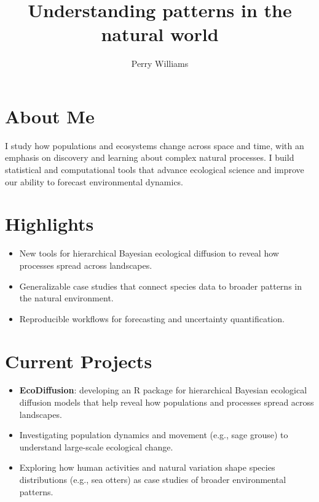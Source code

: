 \title{Understanding patterns in the natural world}
\author{Perry Williams}
\date{}

\maketitle

\section*{About Me}
I study how populations and ecosystems change across space and time, with an emphasis on discovery and learning about complex natural processes. I build statistical and computational tools that advance ecological science and improve our ability to forecast environmental dynamics.

\section*{Highlights}
\begin{itemize}
  \item New tools for hierarchical Bayesian ecological diffusion to reveal how processes spread across landscapes.
  \item Generalizable case studies that connect species data to broader patterns in the natural environment.
  \item Reproducible workflows for forecasting and uncertainty quantification.
\end{itemize}

\section*{Current Projects}
\begin{itemize}
  \item \textbf{EcoDiffusion}: developing an R package for hierarchical Bayesian ecological diffusion models that help reveal how populations and processes spread across landscapes.
  \item Investigating population dynamics and movement (e.g., sage grouse) to understand large-scale ecological change.
  \item Exploring how human activities and natural variation shape species distributions (e.g., sea otters) as case studies of broader environmental patterns.
\end{itemize}
